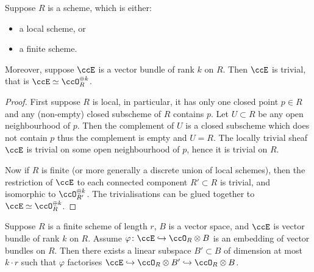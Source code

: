 \documentclass[12pt,a4paper]{article}
\begin{document}
\begin{lemma}\label{lem_bundles_are_trivial}
   Suppose $R$ is a scheme, which is either:
   \begin{itemize}
    \item a local scheme, or
    \item a finite scheme.
   \end{itemize}
   Moreover, suppose $\ccE$ is a vector bundle of rank $k$ on $R$.
   Then $\ccE$ is trivial, that is $\ccE \simeq \ccO_R^{\oplus k}$.
\end{lemma}

\begin{proof}
   First suppose $R$ is local, in particular, it has only one closed point $p\in R$ and any (non-empty) closed subscheme of $R$ contains $p$.
   Let $U \subset R$ be any open neighbourhood of $p$.
   Then the complement of $U$ is a closed subscheme which does not contain $p$ thus the complement is empty and $U = R$.
   The locally trivial sheaf $\ccE$ is trivial on some open neighbourhood of $p$, hence it is trivial on $R$.

   Now if $R$ is finite (or more generally a discrete union of local schemes),
     then the restriction of $\ccE$ to each connected component $R'\subset R$
     is trivial, and isomorphic to $\ccO_{R'}^{\oplus k}$.
   The trivialisations can be glued together to $\ccE\simeq \ccO_{R}^{\oplus k}$.
\end{proof}




\begin{lemma}\label{lem_exists_B_prime}
   Suppose $R$ is a finite scheme of length $r$, $B$ is a vector space, and $\ccE$ is vector bundle of rank $k$ on $R$.
   Assume $\varphi \colon \ccE \hookrightarrow \ccO_R\otimes B$ is an embedding of vector bundles on $R$.
   Then there exists a linear subspace $B' \subset B$ of dimension at most $k \cdot r$ such that $\varphi$ factorises
     $\ccE \hookrightarrow \ccO_R \otimes B'\hookrightarrow \ccO_R\otimes B$.
\end{lemma}
\end{document}

